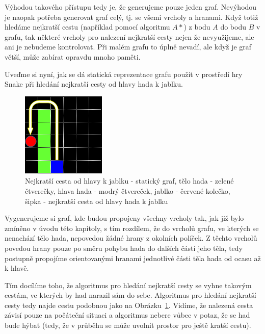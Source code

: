 Výhodou takového přístupu tedy je, že generujeme pouze jeden graf. Nevýhodou je naopak potřeba generovat graf celý, tj. se všemi vrcholy a hranami. Když totiž hledáme nejkratší cestu (například pomocí algoritmu \(A*\)) z bodu $A$ do bodu $B$ v grafu, tak některé vrcholy pro nalezení nejkratší cesty nejen že nevyužijeme, ale ani je nebudeme kontrolovat. Při malém grafu to úplně nevadí, ale když je graf větší, může zabírat opravdu mnoho paměti. 

Uveďme si nyní, jak se dá statická reprezentace grafu použít v prostředí hry Snake při hledání nejkratší cesty od hlavy hada k jablku. 

\begin{figure}
    \centering
    \includegraphics[width=0.5\linewidth]{Images/StaticGraphRepresentation.png}
    \caption{Nejkratší cesta od hlavy k jablku - statický graf, tělo hada - zelené čtverečky, hlava hada - modrý čtvereček, jablko - červené kolečko, šipka - nejkratší cesta od hlavy hada k jablku}
    \label{fig:StaticGraphRepresentation}
\end{figure}

Vygenerujeme si graf, kde budou propojeny všechny vrcholy tak, jak již bylo zmíněno v úvodu této kapitoly, s tím rozdílem, že do vrcholů grafu, ve kterých se nenachází tělo hada, nepovedou žádné hrany z okolních políček. Z těchto vrcholů povedou hrany pouze po směru pohybu hada do dalších částí jeho těla, tedy postupně propojíme orientovanými hranami jednotlivé části těla hada od ocasu až k hlavě. 

Tím docílíme toho, že algoritmus pro hledání nejkratší cesty se vyhne takovým cestám, ve kterých by had narazil sám do sebe. Algoritmus pro hledání nejkratší cesty tedy najde cestu podobnou jako na Obrázku~\ref{fig:StaticGraphRepresentation}. Vidíme, že nalezená cesta závisí pouze na počáteční situaci a algoritmus nebere vůbec v potaz, že se had bude hýbat (tedy, že v průběhu se může uvolnit prostor pro ještě kratší cestu).

